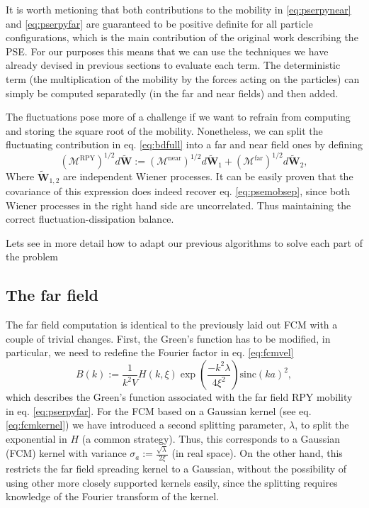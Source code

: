 \documentclass[ twoside,openright,titlepage,numbers=noenddot,%
headinclude,footinclude,cleardoublepage=empty,abstract=on,
BCOR=5mm,paper=a4,fontsize=11pt, dvipsnames
]{scrreprt}
\renewcommand{\vec}[1]{\bm{#1}}
\newcommand{\tens}[1]{\bm{\mathcal{#1}}}
\newcommand{\sinc}{\textrm{sinc}}
\newcommand{\near}{\textrm{near}}
\newcommand{\far}{\textrm{far}}
\newcommand{\noise}{\widetilde{W}}
\begin{document}
It is worth metioning that both contributions to the mobility in \eqref{eq:pserpynear} and \eqref{eq:pserpyfar} are guaranteed to be positive definite for all particle configurations, which is the main contribution of the original work describing the \gls{PSE}\cite{Fiore2017}.
For our purposes this means that we can use the techniques we have already devised in previous sections to evaluate each term. The deterministic term (the multiplication of the mobility by the forces acting on the particles) can simply be computed separatedly (in the far and near fields) and then added.

The fluctuations pose more of a challenge if we want to refrain from computing and storing the square root of the mobility. Nonetheless, we can split the fluctuating contribution in eq. \eqref{eq:bdfull} into a far and near field ones by defining
\begin{equation}
  \label{eq:psenoise}
  (\tens{M}^{\textrm{RPY}})^{1/2} d\vec{\noise} :=  (\tens{M}^{\near})^{1/2} d\vec{\noise}_1 + (\tens{M}^{\far})^{1/2} d\vec{\noise}_2,
\end{equation}
Where $\vec{\noise}_{1,2}$ are independent Wiener processes. It can be easily proven that the covariance of this expression does indeed recover eq. \eqref{eq:psemobsep}, since both Wiener processes in the right hand side are uncorrelated. Thus maintaining the correct fluctuation-dissipation balance. 

Lets see in more detail how to adapt our previous algorithms to solve each part of the problem

\subsection*{The far field}

The far field computation is identical to the previously laid out \gls{FCM} with a couple of trivial changes.
First, the Green's function has to be modified, in particular, we need to redefine the Fourier factor in eq. \eqref{eq:fcmvel}
\begin{equation}
  B(k) := \frac{1}{k^2V}H(k,\xi)\exp\left(\frac{-k^2\lambda}{4\xi^2}\right)\sinc(ka)^2,
\end{equation}
which describes the Green's function associated with the far field \gls{RPY} mobility in eq. \eqref{eq:pserpyfar}. For the \gls{FCM} based on a Gaussian kernel (see eq. \eqref{eq:fcmkernel}) we have introduced a second splitting parameter, $\lambda$, to split the exponential in $H$ (a common strategy\cite{Lindbo2011}\cite{Wang2016}). Thus, this corresponds to a Gaussian (\gls{FCM}) kernel with variance $\sigma_a := \frac{\sqrt{\lambda}}{2\xi}$ (in real space). On the other hand, this restricts the far field spreading kernel to a Gaussian, without the possibility of using other more closely supported kernels easily, since the splitting requires knowledge of the Fourier transform of the kernel.
\end{document}
